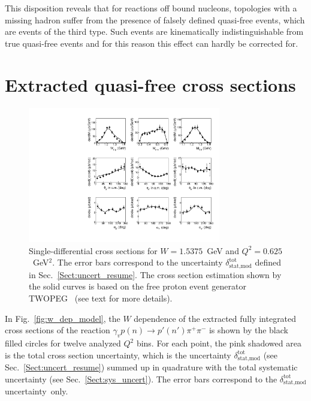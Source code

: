 \documentclass[prc,twocolumn,superscriptaddress,showpacs,amssymb,amsmath,amsfonts,aps,nofootinbib]{revtex4-1}
\begin{document}
This disposition reveals that for reactions off bound nucleons, topologies with a missing hadron suffer from the presence of falsely defined quasi-free events, which are events of the third type. Such events are kinematically indistinguishable from true quasi-free events and for this reason this effect can hardly be corrected for.



\section{Extracted quasi-free cross sections}
\label{Sect:cr_sect_qf}



\begin{figure}[htp]
\begin{center}
\includegraphics[width=0.75\textwidth]{pictures/diff_model2.pdf}
\caption{\small Single-differential cross sections for $W= 1.5375$~GeV and $Q^{2}= 0.625$~GeV$^{2}$. The error bars correspond to the uncertainty $\delta_{\text{stat,mod}}^{\text{tot}}$ defined in Sec.\!~\ref{Sect:uncert_resume}. The cross section estimation shown by the solid curves is based on the free proton event generator TWOPEG~\cite{twopeg} (see text for more details).} \label{fig:diff_model}
\end{center}
\end{figure}

In Fig.\!~\ref{fig:w_dep_model}, the $W$ dependence of the extracted fully integrated cross sections of the reaction $\gamma_{v} p (n) \rightarrow p' (n') \pi^{+} \pi^{-}$ is shown by the black filled circles for twelve analyzed $Q^{2}$ bins. For each point, the pink shadowed area is the total cross section uncertainty, which is the uncertainty $\delta_{\text{stat,mod}}^{\text{tot}}$ (see Sec.\!~\ref{Sect:uncert_resume}) summed up in quadrature with the total systematic uncertainty (see Sec.\!~\ref{Sect:sys_uncert}). The error bars correspond to the $\delta_{\text{stat,mod}}^{\text{tot}}$ uncertainty~only.%
\end{document}
